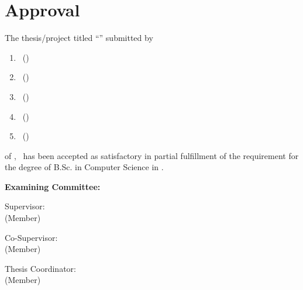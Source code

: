 \section*{Approval}

The thesis/project titled ``\ThesisTitle'' submitted by
\begin{enumerate}
  \item \StudentOneName\ (\StudentOneID)
  \item \StudentTwoName\ (\StudentTwoID)
  \item \StudentThreeName\ (\StudentThreeID)
  \item \StudentFourName\ (\StudentFourID)
  \item \StudentFiveName\ (\StudentFiveID)
\end{enumerate}

of \Semester, \SemesterYear\ has been accepted as satisfactory in partial fulfillment of the requirement for the degree of B.Sc. in Computer Science in \AcceptedSemester.

\vspace{0.5cm}
\textbf{Examining Committee:}

\vspace{0.6cm}

Supervisor:\\
(Member)
\begin{center}
    \hspace{7cm}  \hspace{1cm}
\end{center}

Co-Supervisor:\\
(Member)
\begin{center}
    \hspace{7cm}  \hspace{1cm}
\end{center}

Thesis Coordinator:\\
(Member)
\begin{center}
    \hspace{7cm}  \hspace{1cm}
\end{center}

